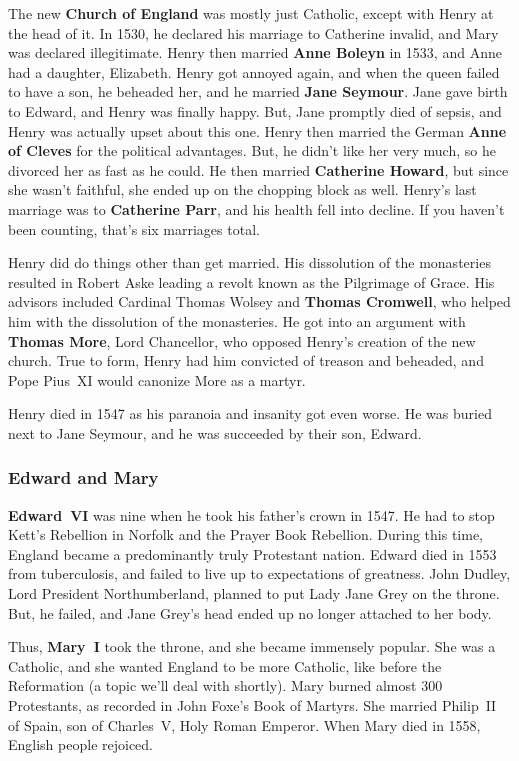 The new \textbf{Church of England} was mostly just Catholic, except with Henry at the head of it.
In 1530, he declared his marriage to Catherine invalid, and Mary was declared illegitimate.
Henry then married \textbf{Anne Boleyn} in 1533, and Anne had a daughter, Elizabeth.
Henry got annoyed again, and when the queen failed to have a son, he beheaded her, and he married \textbf{Jane Seymour}.
Jane gave birth to Edward, and Henry was finally happy.
But, Jane promptly died of sepsis, and Henry was actually upset about this one.
Henry then married the German \textbf{Anne of Cleves} for the political advantages.
But, he didn't like her very much, so he divorced her as fast as he could.
He then married \textbf{Catherine Howard}, but since she wasn't faithful,
she ended up on the chopping block as well.
Henry's last marriage was to \textbf{Catherine Parr}, and his health fell into decline.
If you haven't been counting, that's six marriages total.

Henry did do things other than get married.
His dissolution of the monasteries resulted in Robert Aske leading a revolt known as the Pilgrimage of Grace.
His advisors included Cardinal Thomas Wolsey and \textbf{Thomas Cromwell},
who helped him with the dissolution of the monasteries.
He got into an argument with \textbf{Thomas More}, Lord Chancellor, who opposed Henry's creation of the new church.
True to form, Henry had him convicted of treason and beheaded, and Pope Pius~XI would canonize More as a martyr.

Henry died in 1547 as his paranoia and insanity got even worse.
He was buried next to Jane Seymour, and he was succeeded by their son, Edward.

\subsubsection*{Edward and Mary}

\textbf{Edward~VI} was nine when he took his father's crown in 1547.
He had to stop Kett's Rebellion in Norfolk and the Prayer Book Rebellion.
During this time, England became a predominantly truly Protestant nation.
Edward died in 1553 from tuberculosis, and failed to live up to expectations of greatness.
John Dudley, Lord President Northumberland, planned to put Lady Jane Grey on the throne.
But, he failed, and Jane Grey's head ended up no longer attached to her body.

Thus, \textbf{Mary~I} took the throne, and she became immensely popular.
She was a Catholic, and she wanted England to be more Catholic,
like before the Reformation (a topic we'll deal with shortly).
Mary burned almost 300 Protestants, as recorded in John Foxe's Book of Martyrs.
She married Philip~II of Spain, son of Charles~V, Holy Roman Emperor.
When Mary died in 1558, English people rejoiced.

